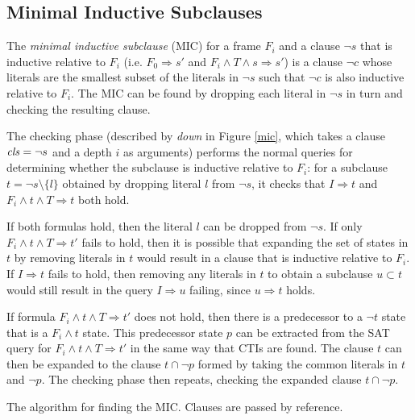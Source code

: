 \documentclass[12pt,a4paper,twoside,openright]{report}
\begin{document}
{{\subsection{Minimal Inductive Subclauses}
The \emph{minimal inductive subclause} (MIC) for a frame $F_i$ and a clause $\neg s$ that
is inductive relative to $F_i$
(i.e. $F_0 \Rightarrow s'$ and $F_i \wedge T \wedge s \Rightarrow s'$)
is a clause $\neg c$ whose
literals are the smallest subset of the literals in $\neg s$ such that
$\neg c$ is also inductive relative to $F_i$.
The MIC can be found by dropping each literal
in $\neg s$ in turn and checking the resulting clause.

The checking phase (described by {\it down} in Figure \ref{mic},
which takes a clause ${\it cls} = \neg s$ and a depth $i$ as arguments)
performs the normal queries
for determining whether the subclause is inductive relative to
$F_i$: for a subclause $t = \neg s \setminus \{l\}$ obtained by dropping
literal $l$ from $\neg s$, it checks that
$I \Rightarrow t$ and $F_i \wedge t \wedge T \Rightarrow t$ both hold.

If both formulas hold, then the literal $l$ can be dropped from $\neg s$.
If only $F_i \wedge t \wedge T \Rightarrow t'$ fails to hold, then
it is possible that expanding the set of states in $t$ by removing %
literals in $t$ would result in a clause that is inductive relative to $F_i$.
If $I \Rightarrow t$ fails to hold, then removing any literals in $t$ to
obtain a subclause $u \subset t$ would still result in the query $I \Rightarrow u$
failing, since $u \Rightarrow t$ holds.

If formula $F_i \wedge t \wedge T \Rightarrow t'$ does not hold, then
there is a predecessor to a $\neg t$ state that is a $F_i \wedge t$ state.
This predecessor state $p$ can be extracted from the SAT query for
$F_i \wedge t \wedge T \Rightarrow t'$ in the same way that CTIs are found.
The clause $t$ can then be expanded to the clause $t \cap \neg p$
formed by taking the common literals in $t$ and $\neg p$.
The checking phase then repeats, checking the expanded clause $t \cap \neg p$.

\begin{algorithm}[t]
\DontPrintSemicolon
{}
\caption{The algorithm for finding the MIC. Clauses are
passed by reference.}
\label{mic}
\end{algorithm}

}}
\end{document}
